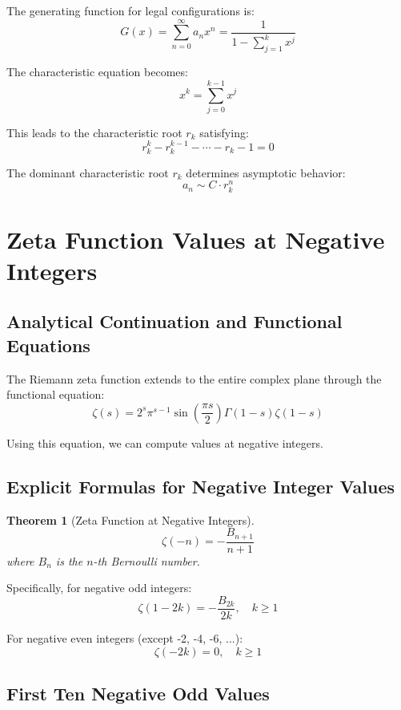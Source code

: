 \documentclass[12pt]{article}
\newtheorem{theorem}{Theorem}[section]
\begin{document}
The generating function for legal configurations is:
$$G(x) = \sum_{n=0}^{\infty} a_n x^n = \frac{1}{1 - \sum_{j=1}^{k} x^j}$$

The characteristic equation becomes:
$$x^k = \sum_{j=0}^{k-1} x^j$$

This leads to the characteristic root $r_k$ satisfying:
$$r_k^k - r_k^{k-1} - \cdots - r_k - 1 = 0$$

The dominant characteristic root $r_k$ determines asymptotic behavior:
$$a_n \sim C \cdot r_k^n$$

\section{Zeta Function Values at Negative Integers}

\subsection{Analytical Continuation and Functional Equations}

The Riemann zeta function extends to the entire complex plane through the functional equation:
$$\zeta(s) = 2^s \pi^{s-1} \sin\left(\frac{\pi s}{2}\right) \Gamma(1-s) \zeta(1-s)$$

Using this equation, we can compute values at negative integers.

\subsection{Explicit Formulas for Negative Integer Values}

\begin{theorem}[Zeta Function at Negative Integers]
$$\zeta(-n) = -\frac{B_{n+1}}{n+1}$$
where $B_n$ is the $n$-th Bernoulli number.
\end{theorem}

Specifically, for negative odd integers:
$$\zeta(1-2k) = -\frac{B_{2k}}{2k}, \quad k \geq 1$$

For negative even integers (except -2, -4, -6, ...):
$$\zeta(-2k) = 0, \quad k \geq 1$$

\subsection{First Ten Negative Odd Values}
\end{document}

